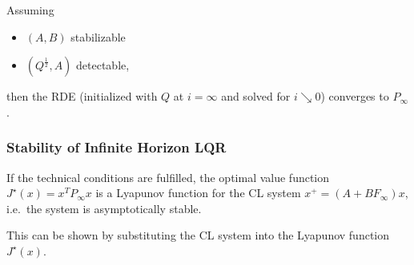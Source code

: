 \newpar{}

Assuming
\begin{itemize}
    \item $(A,B)$ stabilizable
    \item $(Q^{\frac{1}{2}}, A)$ detectable,
\end{itemize}
then the RDE (initialized with $Q$ at $i = \infty$ and solved for $i\searrow 0$) converges to $P_{\infty}$.

\subsubsection{Stability of Infinite Horizon LQR}

If the technical conditions are fulfilled, the optimal value function $J^{\star} (x) = x^T P_{\infty} x$ is a Lyapunov function for the CL system $x^+ = (A + BF_{\infty} )x$, i.e.\ the system is asymptotically stable.

This can be shown by substituting the CL system into the Lyapunov function $J^{\star} (x)$.




